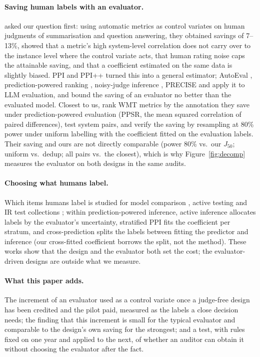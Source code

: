 \documentclass[11pt]{article}
\newcommand{\Jt}{J_{50}}
\begin{document}
\paragraph{Saving human labels with an evaluator.} \citet{chaganty2018price} asked our question first: using automatic
metrics as control variates on human judgments of summarisation and question answering, they obtained savings of
7--13\%, showed that a metric's high system-level correlation does not carry over to the instance level where the
control variate acts, that human rating noise caps the attainable saving, and that a coefficient estimated on the same
data is slightly biased. PPI and PPI++ \citep{angelopoulos2023ppi,angelopoulos2023ppipp} turned this into a general
estimator; AutoEval \citep{boyeau2024autoeval}, prediction-powered ranking \citep{chatzi2024ppr}, noisy-judge inference
\citep{chen2026noisy}, PRECISE \citep{divekar2026precise} and \citet{gligoric2024unconfident} apply it to LLM
evaluation, and \citet{dorner2025limits} bound the saving of an evaluator no better than the evaluated model. Closest
to us, \citet{gao2026ppsr} rank WMT metrics by the annotation they save under prediction-powered evaluation (PPSR, the
mean squared correlation of paired differences), test system pairs, and verify the saving by resampling at 80\% power
under uniform labelling with the coefficient fitted on the evaluation labels. Their saving and ours are not directly
comparable (power 80\% vs.\ our $\Jt$; uniform vs.\ dedup; all pairs vs.\ the closest), which is why
Figure~\ref{fig:decomp} measures the evaluator on both designs in the same audits.
\paragraph{Choosing what humans label.} Which items humans label is studied for model comparison
\citep{sawade2012active}, active testing \citep{kossen2021active} and IR test collections
\citep{sakai2016topic,li2017active,oosterhuis2024reliable}; within prediction-powered inference, active inference
\citep{zrnic2024active} allocates labels by the evaluator's uncertainty, stratified PPI \citep{fisch2024stratified}
fits the coefficient per stratum, and cross-prediction \citep{zrnic2024cross} splits the labels between fitting the
predictor and inference (our cross-fitted coefficient borrows the split, not the method). These works show that the
design and the evaluator both set the cost; the evaluator-driven designs are outside what we measure.
\paragraph{What this paper adds.} The increment of an evaluator used as a control variate once a judge-free design
has been credited and the pilot paid, measured as the labels a close decision needs; the finding that this increment is
small for the typical evaluator and comparable to the design's own saving for the strongest; and a test, with rules
fixed on one year and applied to the next, of whether an auditor can obtain it without choosing the evaluator after
the fact.
\end{document}
